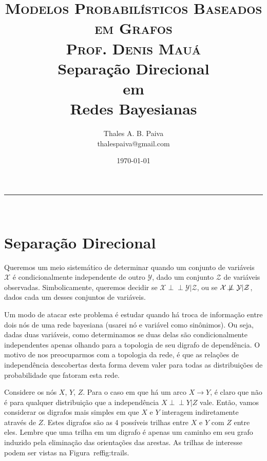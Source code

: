 \documentclass[paper=a4, fontsize=11pt]{scrartcl} %
\title{	
\normalfont \normalsize 
\textsc{Modelos Probabilísticos Baseados em Grafos} \\ 
\textsc{Prof. Denis Mauá} \\ [25pt]
\huge Separação Direcional \\ em \\ Redes Bayesianas\\ [25pt]
}
\author{Thales A. B. Paiva \\ thalespaiva@gmail.com} %
\date{\today} %
\numberwithin{equation}{subsection}
\numberwithin{figure}{subsection}
\numberwithin{table}{subsection}
\numberwithin{definition}{subsection}
\numberwithin{theorem}{subsection}
\numberwithin{property}{subsection}
\numberwithin{proposition}{subsection}
\numberwithin{equation}{section}
\numberwithin{figure}{section}
\numberwithin{table}{section}
\numberwithin{definition}{section}
\numberwithin{theorem}{section}
\numberwithin{property}{section}
\numberwithin{proposition}{section}
\newcommand{\horrule}[1]{\rule{\linewidth}{#1}} %
\newcommand{\set}[1]{\mathcal{#1}}
\def\ind{\perp\!\!\!\perp}
\def\nind{\not\!\perp\!\!\!\perp}
\begin{document}
\maketitle %
\horrule{1pt} \\[0.5cm] %

\tableofcontents

\pagebreak
\section{Separação Direcional}

Queremos um meio sistemático de determinar quando um conjunto de variáveis $\set{X}$ é condicionalmente independente de outro $\set{Y}$, dado um conjunto $\set{Z}$ de variáveis observadas. Simbolicamente, queremos decidir se $ \set{X} \ind \set{Y} | \set{Z}$, ou se $ \set{X} \nind \set{Y} | \set{Z}$, dados cada um desses conjuntos de variáveis. 

Um modo de atacar este problema é estudar quando há troca de informação entre dois nós de uma rede bayesiana (usarei nó e variável como sinônimos). Ou seja, dadas duas variáveis, como determinamos se duas delas são condicionalmente independentes apenas olhando para a topologia de seu digrafo de dependência. O motivo de nos preocuparmos com a topologia da rede, é que as relações de independência descobertas desta forma devem valer para todas as distribuições de probabilidade que fatoram esta rede.

Considere os nós $X$, $Y$, $Z$. Para o caso em que há um arco $X \rightarrow Y$, é claro que não é para qualquer distribuição que a independência $X \ind Y | Z$ vale. Então, vamos considerar os digrafos mais simples em que $X$ e $Y$ interagem indiretamente através de $Z$. Estes digrafos são as 4 possíveis trilhas entre $X$ e $Y$ com $Z$ entre eles. Lembre que uma trilha em um digrafo é apenas um caminho em seu grafo induzido pela eliminação das orientações das arestas. As trilhas de interesse podem ser vistas na Figura~ref{fig:trails}.
\end{document}
